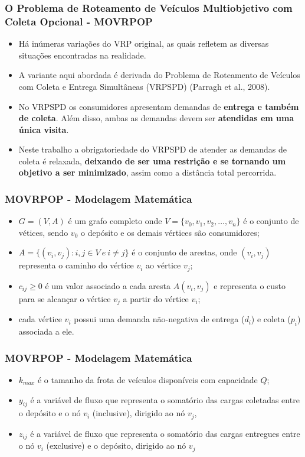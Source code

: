 \documentclass{beamer}
\begin{document}
\begin{frame}
 \frametitle{O Problema de Roteamento de Veículos Multiobjetivo com Coleta Opcional - MOVRPOP}
 \begin{itemize}
  \item Há inúmeras variações do VRP original, as quais refletem as diversas situações encontradas na realidade.
  \item A variante aqui abordada é derivada do Problema de Roteamento de Veículos com Coleta e Entrega Simultâneas (VRPSPD) (Parragh et al., 2008).  
  \item No VRPSPD os consumidores apresentam demandas de \textbf{entrega e também de coleta}. Além disso, ambas as demandas devem ser \textbf{atendidas em uma única visita}. 
  \item Neste trabalho a obrigatoriedade do VRPSPD de atender as demandas de coleta é relaxada, \textbf{deixando de ser uma restrição e se tornando um objetivo a ser 
  minimizado}, assim como a distância total percorrida.
 \end{itemize}
  
\end{frame}

\begin{frame}
 \frametitle{MOVRPOP - Modelagem Matemática}
 \begin{itemize}
 \item $G = (V,A)$ é um grafo completo onde $V = \{v_0, v_1, v_2, \ldots, v_n\}$ é o conjunto de vétices, sendo $v_0$ o depósito e os demais vértices são consumidores;
 \item $A = \{(v_i,v_j) : i,j \in V ~ e ~ i \neq j\}$ é o conjunto de arestas, onde $(v_i,v_j)$ representa o caminho do vértice $v_i$ ao vértice $v_j$; 
 \item $c_{ij} \geq 0$ é um valor associado a cada aresta $A(v_i, v_j)$ e representa o custo para se alcançar o vértice $v_j$ a partir do vértice $v_i$;
 \item cada vértice $v_i$ possui uma demanda não-negativa de entrega ($d_i$) e coleta ($p_i$) associada a ele.
\end{itemize}
  
\end{frame}

\begin{frame}
 \frametitle{MOVRPOP - Modelagem Matemática}
 \begin{itemize}
 \item $k_{max}$ é o tamanho da frota de veículos disponíveis com capacidade $Q$;
 \item $y_{ij}$ é a variável de fluxo que representa o somatório das cargas coletadas entre o depósito e o nó $v_i$ (inclusive), dirigido ao nó $v_j$, 
 \item $z_{ij}$ é a variável de fluxo que representa o somatório das cargas entregues entre o nó $v_i$ (exclusive) e o depósito, dirigido ao nó $v_j$
\end{itemize}
  
\end{frame}
\end{document}
